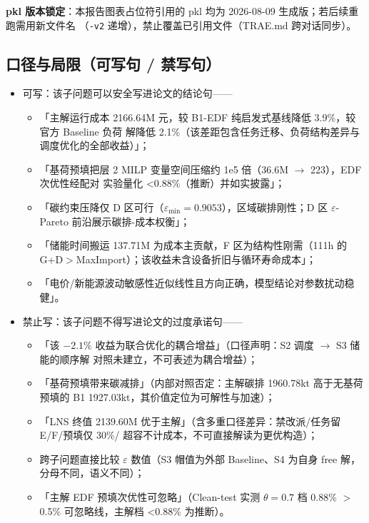 \documentclass{internal-report}
\begin{document}
\textbf{pkl 版本锁定}：本报告图表占位符引用的 pkl 均为 2026-08-09 生成版；若后续重跑需用新文件名
（\texttt{-v2} 递增），禁止覆盖已引用文件（TRAE.md 跨对话同步）。

\subsection{口径与局限（可写句 / 禁写句）}

\begin{itemize}
  \item 可写：该子问题可以安全写进论文的结论句——
    \begin{itemize}
      \item 「主解运行成本 2166.64M 元，较 B1-EDF 纯启发式基线降低 3.9\%，较官方 Baseline 负荷
            解降低 2.1\%（该差距包含任务迁移、负荷结构差异与调度优化的全部收益）」；
      \item 「基荷预填把层 2 MILP 变量空间压缩约 1e5 倍（36.6M $\to$ 223），EDF 次优性经配对
            实验量化 <0.88\%（推断）并如实披露」；
      \item 「碳约束压降仅 D 区可行（$\varepsilon_{\min}=0.9053$），区域碳排刚性；D 区
            $\varepsilon$-Pareto 前沿展示碳排-成本权衡」；
      \item 「储能时间搬运 137.71M 为成本主贡献，F 区为结构性刚需（111h 的
            G+D$>$MaxImport）；该收益未含设备折旧与循环寿命成本」；
      \item 「电价/新能源波动敏感性近似线性且方向正确，模型结论对参数扰动稳健」。
    \end{itemize}
  \item 禁止写：该子问题不得写进论文的过度承诺句——
    \begin{itemize}
      \item 「该 $-2.1\%$ 收益为联合优化的耦合增益」（口径声明：S2 调度 $\to$ S3 储能的顺序解
            对照未建立，不可表述为耦合增益）；
      \item 「基荷预填带来碳减排」（内部对照否定：主解碳排 1960.78kt 高于无基荷预填的 B1
            1927.03kt，其价值定位为可解性与加速）；
      \item 「LNS 终值 2139.60M 优于主解」（含多重口径差异：禁改派/任务留 E/F/预填仅 30\%/
            超容不计成本，不可直接解读为更优构造）；
      \item 跨子问题直接比较 $\varepsilon$ 数值（S3 帽值为外部 Baseline、S4 为自身 free 解，
            分母不同，语义不同）；
      \item 「主解 EDF 预填次优性可忽略」（Clean-test 实测 $\theta{=}0.7$ 档 0.88\% $>$
            0.5\% 可忽略线，主解档 <0.88\% 为推断）。
    \end{itemize}
\end{itemize}
\end{document}

